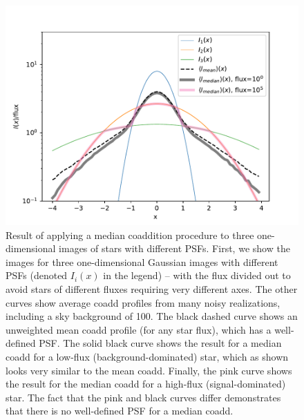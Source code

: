 \documentclass{aastex63}
\begin{document}
\begin{figure}
\begin{center}
\includegraphics[width=5in]{figures/noisy_median_coadd_psf.pdf}
 \caption{Result of applying a median coaddition procedure to three one-dimensional images of stars with different PSFs. 
 First, we show the images for three one-dimensional Gaussian images with different PSFs (denoted $I_i(x)$ in the legend) -- with the flux divided out to avoid stars of different fluxes requiring very different axes.  The other curves show average coadd profiles from many noisy realizations, including a sky background of 100.  The black dashed curve shows an unweighted mean coadd profile (for any star flux), which has a well-defined PSF.  The solid black curve shows the result for a median coadd for a low-flux (background-dominated) star, which as shown looks very similar to the mean coadd.  Finally, the pink curve shows the result for the median coadd for a high-flux (signal-dominated) star.  
 The fact that the pink and black curves differ demonstrates that there is no well-defined PSF for a median coadd.
 }
 \label{fig:median_coadd_psf}
\end{center}
 \end{figure}
\end{document}
